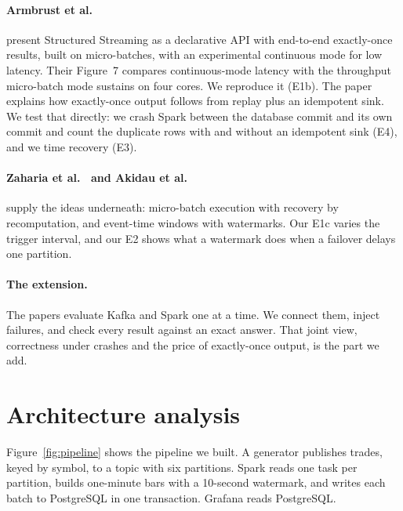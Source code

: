 \paragraph{Armbrust et al.~\cite{armbrust2018}} present Structured Streaming as a declarative API with
end-to-end exactly-once results, built on micro-batches, with an experimental continuous mode for low latency.
Their Figure~7 compares continuous-mode latency with the throughput micro-batch mode sustains on four cores.
We reproduce it (E1b). The paper explains how exactly-once output follows from replay plus an idempotent sink. We
test that directly: we crash Spark between the database commit and its own commit and count the duplicate rows
with and without an idempotent sink (E4), and we time recovery (E3).

\paragraph{Zaharia et al.~\cite{zaharia2013} and Akidau et al.~\cite{akidau2015}} supply the ideas underneath:
micro-batch execution with recovery by recomputation, and event-time windows with watermarks. Our E1c varies the
trigger interval, and our E2 shows what a watermark does when a failover delays one partition.

\paragraph{The extension.} The papers evaluate Kafka and Spark one at a time. We connect them, inject
failures, and check every result against an exact answer. That joint view, correctness under crashes and the
price of exactly-once output, is the part we add.

\section{Architecture analysis}
\label{sec:arch}
Figure~\ref{fig:pipeline} shows the pipeline we built. A generator publishes trades, keyed by symbol,
to a topic with six partitions. Spark reads one task per partition, builds one-minute bars with a
10-second watermark, and writes each batch to PostgreSQL in one transaction. Grafana reads PostgreSQL.

